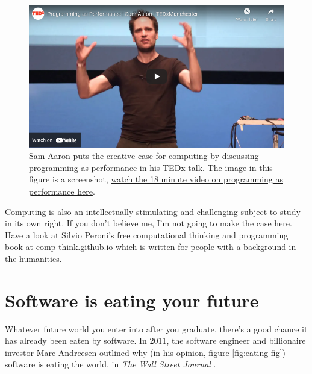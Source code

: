\documentclass[
]{book}
\begin{document}
\begin{figure}

{\centering \includegraphics[width=1\linewidth]{images/youtube-sonicpi} 

}

\caption{Sam Aaron puts the creative case for computing by discussing programming as performance in his TEDx talk. \citep{youtube-sonicpi} The image in this figure is a screenshot, \href{https://www.youtube.com/watch?v=0lTZ8Tuyu5I}{watch the 18 minute video on programming as performance here}.}\label{fig:sonicpi-fig}
\end{figure}



Computing is also an intellectually stimulating and challenging subject to study in its own right. If you don't believe me, I'm not going to make the case here. Have a look at Silvio Peroni's free computational thinking and programming book at \href{https://comp-think.github.io/}{comp-think.github.io} which is written for people with a background in the humanities. \citep{peroni}

\hypertarget{seating}{%
\section{Software is eating your future}\label{seating}}

Whatever future world you enter into after you graduate, there's a good chance it has already been eaten by software. In 2011, the software engineer and billionaire investor \href{https://en.wikipedia.org/wiki/Marc_Andreessen}{Marc Andreesen} outlined why (in his opinion, figure \ref{fig:eating-fig}) software is eating the world, in \emph{The Wall Street Journal} \citep{eatingtheworld}.
\end{document}
